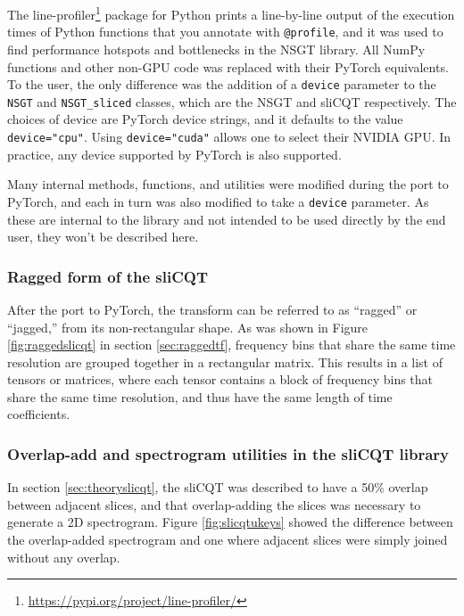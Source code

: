 \documentclass[report.tex]{subfiles}
\begin{document}
The line-profiler\footnote{\url{https://pypi.org/project/line-profiler/}} package for Python prints a line-by-line output of the execution times of Python functions that you annotate with \Verb#@profile#, and it was used to find performance hotspots and bottlenecks in the NSGT library. All NumPy functions and other non-GPU code was replaced with their PyTorch equivalents. To the user, the only difference was the addition of a \Verb#device# parameter to the \Verb#NSGT# and \Verb#NSGT_sliced# classes, which are the NSGT and sliCQT respectively. The choices of device are PyTorch device strings, and it defaults to the value \Verb#device="cpu"#. Using \Verb#device="cuda"# allows one to select their NVIDIA GPU. In practice, any device supported by PyTorch is also supported.

Many internal methods, functions, and utilities were modified during the port to PyTorch, and each in turn was also modified to take a \Verb#device# parameter. As these are internal to the library and not intended to be used directly by the end user, they won't be described here.

\subsubsection{Ragged form of the sliCQT}
\label{sec:slicqtshape}

After the port to PyTorch, the transform can be referred to as ``ragged'' or ``jagged,'' from its non-rectangular shape. As was shown in Figure \ref{fig:raggedslicqt} in section \ref{sec:raggedtf}, frequency bins that share the same time resolution are grouped together in a rectangular matrix. This results in a list of tensors or matrices, where each tensor contains a block of frequency bins that share the same time resolution, and thus have the same length of time coefficients.

\subsubsection{Overlap-add and spectrogram utilities in the sliCQT library}
\label{sec:slicqtutil}

In section \ref{sec:theoryslicqt}, the sliCQT was described to have a 50\% overlap between adjacent slices, and that overlap-adding the slices was necessary to generate a 2D spectrogram. Figure \ref{fig:slicqtukeys} showed the difference between the overlap-added spectrogram and one where adjacent slices were simply joined without any overlap.
\end{document}
